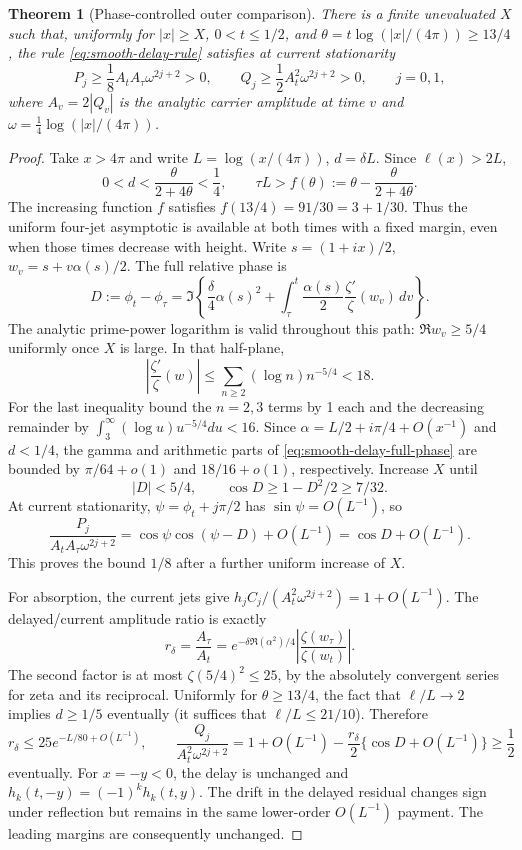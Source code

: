 \documentclass[11pt]{article}
\numberwithin{equation}{section}
\newtheorem{theorem}{Theorem}[section]
\theoremstyle{definition}
\theoremstyle{remark}
\begin{document}
\begin{theorem}[Phase-controlled outer comparison]
\label{thm:phase-controlled-delay}
There is a finite unevaluated $X$ such that, uniformly for
$|x|\ge X$, $0<t\le1/2$, and
$\theta=t\log(|x|/(4\pi))\ge13/4$, the rule
\eqref{eq:smooth-delay-rule} satisfies at current stationarity
\[
 P_j\ge\frac18A_tA_\tau\omega^{2j+2}>0,\qquad
 Q_j\ge\frac12A_t^2\omega^{2j+2}>0,\qquad j=0,1,
\]
where $A_v=2|Q_v|$ is the analytic carrier amplitude at time $v$ and
$\omega=\frac14\log(|x|/(4\pi))$.
\end{theorem}
\begin{proof}
Take $x>4\pi$ and write $L=\log(x/(4\pi))$, $d=\delta L$.
Since $\ell(x)>2L$,
\[
 0<d<\frac{\theta}{2+4\theta}<\frac14,\qquad
 \tau L>f(\theta):=\theta-\frac{\theta}{2+4\theta}.
\]
The increasing function $f$ satisfies $f(13/4)=91/30=3+1/30$.
Thus the uniform four-jet asymptotic is available at both times with
a fixed margin, even when those times decrease with height.  Write
$s=(1+ix)/2$, $w_v=s+v\alpha(s)/2$.  The full relative phase is
\begin{equation}
 D:=\phi_t-\phi_\tau
 =\Im\left\{\frac\delta4\alpha(s)^2+
       \int_\tau^t\frac{\alpha(s)}2
                \frac{\zeta'}{\zeta}(w_v)\,dv\right\}.
 \label{eq:smooth-delay-full-phase}
\end{equation}
The analytic prime-power logarithm is valid throughout this path:
$\Re w_v\ge5/4$ uniformly once $X$ is large.  In that half-plane,
\[
 \left|\frac{\zeta'}\zeta(w)\right|
 \le\sum_{n\ge2}(\log n)n^{-5/4}<18.
\]
For the last inequality bound the $n=2,3$ terms by 1 each and the
decreasing remainder by
$\int_3^\infty(\log u)u^{-5/4}du<16$.
Since $\alpha=L/2+i\pi/4+O(x^{-1})$ and $d<1/4$, the gamma and
arithmetic parts of \eqref{eq:smooth-delay-full-phase} are bounded by
$\pi/64+o(1)$ and $18/16+o(1)$, respectively.  Increase $X$ until
\[
 |D|<5/4,\qquad \cos D\ge1-D^2/2\ge7/32.
\]
At current stationarity, $\psi=\phi_t+j\pi/2$ has
$\sin\psi=O(L^{-1})$, so
\[
 \frac{P_j}{A_tA_\tau\omega^{2j+2}}
 =\cos\psi\cos(\psi-D)+O(L^{-1})=\cos D+O(L^{-1}).
\]
This proves the bound $1/8$ after a further uniform increase of $X$.

For absorption, the current jets give
$h_jC_j/(A_t^2\omega^{2j+2})=1+O(L^{-1})$.
The delayed/current amplitude ratio is exactly
\[
 r_\delta=\frac{A_\tau}{A_t}
  =e^{-\delta\Re(\alpha^2)/4}
       \left|\frac{\zeta(w_\tau)}{\zeta(w_t)}\right|.
\]
The second factor is at most $\zeta(5/4)^2\le25$, by the
absolutely convergent series for zeta and its reciprocal.  Uniformly
for $\theta\ge13/4$, the fact that $\ell/L\to2$ implies $d\ge1/5$
eventually (it suffices that $\ell/L\le21/10$).  Therefore
\[
 r_\delta\le25e^{-L/80+O(L^{-1})},\qquad
 \frac{Q_j}{A_t^2\omega^{2j+2}}
 =1+O(L^{-1})-\frac{r_\delta}{2}\{\cos D+O(L^{-1})\}
 \ge\frac12
\]
eventually.  For $x=-y<0$, the delay is unchanged and
$h_k(t,-y)=(-1)^kh_k(t,y)$.  The drift in the delayed residual
changes sign under reflection but remains in the same lower-order
$O(L^{-1})$ payment.  The leading margins are consequently unchanged.
\end{proof}
\end{document}
